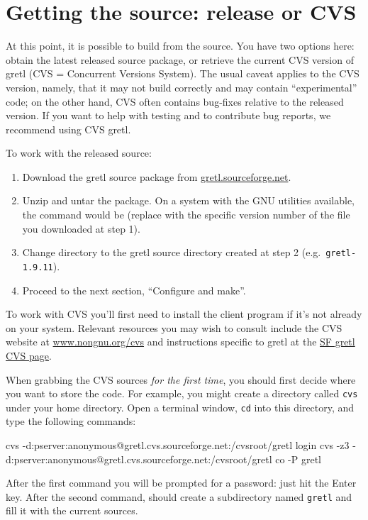 \section{Getting the source: release or CVS}

At this point, it is possible to build from the source.  You have two
options here: obtain the latest released source package, or retrieve
the current CVS version of gretl (CVS = Concurrent Versions
System).  The usual caveat applies to the CVS version, namely, that it
may not build correctly and may contain ``experimental'' code; on the
other hand, CVS often contains bug-fixes relative to the released
version.  If you want to help with testing and to contribute bug
reports, we recommend using CVS gretl.

To work with the released source:
\begin{enumerate}
\item Download the gretl source package from
  \href{http://gretl.sourceforge.net/}{gretl.sourceforge.net}.
\item Unzip and untar the package.  On a system with the GNU utilities
  available, the command would be 
  (replace  with the specific version number of the file you
  downloaded at step 1).
\item Change directory to the gretl source directory created at step 2
  (e.g.\ \verb+gretl-1.9.11+).
\item Proceed to the next section, ``Configure and make''.
\end{enumerate}

To work with CVS you'll first need to install the  client
program if it's not already on your system.  Relevant resources you
may wish to consult include the CVS website at
\href{http://www.nongnu.org/cvs/}{www.nongnu.org/cvs} and instructions
specific to gretl at the
\href{http://sourceforge.net/p/gretl/code/?source=navbar}{SF gretl CVS
  page}.

When grabbing the CVS sources \textit{for the first time}, you should
first decide where you want to store the code.  For example, you might
create a directory called \texttt{cvs} under your home directory.
Open a terminal window, \texttt{cd} into this directory, and type
the following commands:
%
\begin{code}
cvs -d:pserver:anonymous@gretl.cvs.sourceforge.net:/cvsroot/gretl login
cvs -z3 -d:pserver:anonymous@gretl.cvs.sourceforge.net:/cvsroot/gretl co -P gretl
\end{code}
%
After the first command you will be prompted for a password: just hit
the Enter key.  After the second command,  should create a
subdirectory named \texttt{gretl} and fill it with the current
sources.

